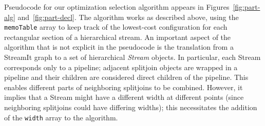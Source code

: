 Pseudocode for our optimization selection algorithm appears in
Figures~\ref{fig:part-alg} and~\ref{fig:part-decl}.  The algorithm
works as described above, using the {\tt memoTable} array to keep
track of the lowest-cost configuration for each rectangular section of
a hierarchical stream.  An important aspect of the algorithm that is
not explicit in the pseudocode is the translation from a StreamIt
graph to a set of hierarchical {\it Stream} objects.  In particular,
each Stream corresponds only to a pipeline; adjacent 
splitjoin objects are wrapped in a pipeline and their children
are considered direct children of the pipeline. This enables
different parts of neighboring splitjoins to be combined.
However, it implies that a Stream might have a different width
at different points (since neighboring splitjoins could have
differing widths); this necessitates the addition of the {\tt width}
array to the algorithm.

